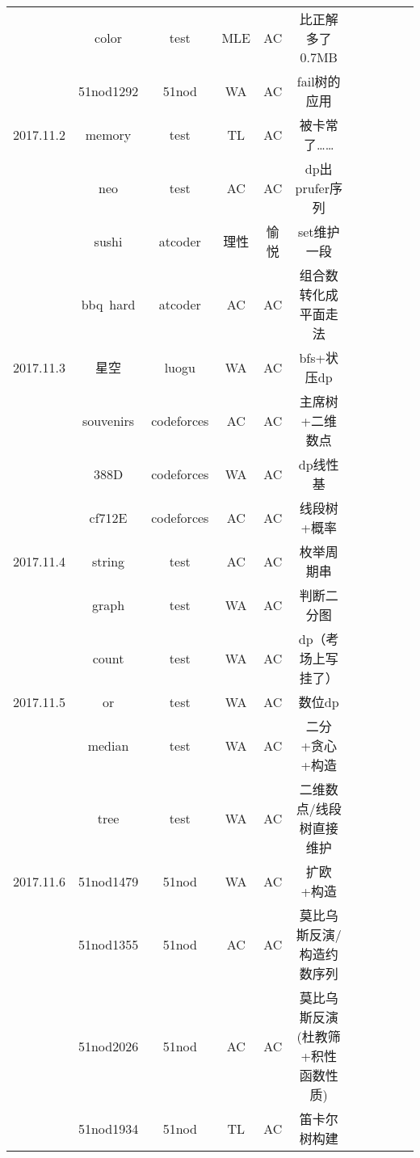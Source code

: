\documentclass[landscape]{article}
\begin{document}
\begin{longtable}{ccccccccccc}
  & color & test & MLE & AC & 比正解多了0.7MB\\
  & 51nod1292 & 51nod & WA & AC & fail树的应用\\
  \hline
  2017.11.2 & memory & test & TL & AC & 被卡常了……\\
  & neo & test & AC & AC & dp出prufer序列\\
  & sushi & atcoder & 理性 & 愉悦 & set维护一段\\
  & bbq\ hard & atcoder & AC & AC & 组合数转化成平面走法\\
  \hline
  2017.11.3 & 星空 & luogu & WA & AC & bfs+状压dp\\
  & souvenirs & codeforces & AC & AC & 主席树+二维数点\\
  & 388D & codeforces & WA & AC & dp线性基\\
  & cf712E & codeforces & AC & AC & 线段树+概率\\
  \hline
  2017.11.4 & string & test & AC & AC & 枚举周期串\\
  & graph & test & WA & AC & 判断二分图\\
  & count & test & WA & AC & dp（考场上写挂了）\\
  \hline
  2017.11.5 & or & test & WA & AC & 数位dp\\
  & median & test & WA & AC & 二分+贪心+构造\\
  & tree & test & WA & AC & 二维数点/线段树直接维护\\
  \hline
  2017.11.6 & 51nod1479 & 51nod & WA & AC & 扩欧+构造\\
  & 51nod1355 & 51nod & AC & AC & 莫比乌斯反演/构造约数序列\\
  & 51nod2026 & 51nod & AC & AC & 莫比乌斯反演(杜教筛+积性函数性质)\\
  & 51nod1934 & 51nod & TL & AC & 笛卡尔树构建\\
  \hline
\end{longtable}
\end{document}
